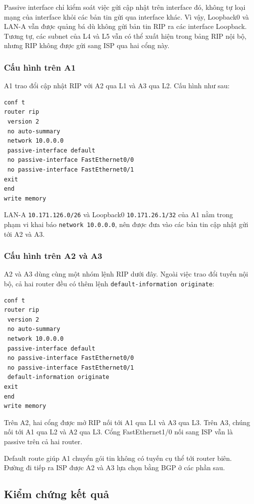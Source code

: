 Passive interface chỉ kiểm soát việc gửi
cập nhật trên interface đó, không tự loại
mạng của interface khỏi các bản tin gửi
qua interface khác. Vì vậy, Loopback0
và LAN-A vẫn được quảng bá dù không
gửi bản tin RIP ra các interface Loopback.
Tương tự, các subnet của L4 và L5
vẫn có thể xuất hiện trong bảng RIP nội bộ,
nhưng RIP không được gửi sang ISP qua hai cổng này.

\subsubsection{Cấu hình trên A1}

A1 trao đổi cập nhật RIP với A2 qua L1
và A3 qua L2. Cấu hình như sau:

\begin{lstlisting}
conf t
router rip
 version 2
 no auto-summary
 network 10.0.0.0
 passive-interface default
 no passive-interface FastEthernet0/0
 no passive-interface FastEthernet0/1
exit
end
write memory
\end{lstlisting}

LAN-A \texttt{10.171.126.0/26} và Loopback0
\texttt{10.171.26.1/32} của A1 nằm trong
phạm vi khai báo \texttt{network 10.0.0.0},
nên được đưa vào các bản tin cập nhật
gửi tới A2 và A3.

\subsubsection{Cấu hình trên A2 và A3}

A2 và A3 dùng cùng một nhóm lệnh RIP dưới đây.
Ngoài việc trao đổi tuyến nội bộ,
cả hai router đều có thêm lệnh
\texttt{default-information originate}:

\begin{lstlisting}
conf t
router rip
 version 2
 no auto-summary
 network 10.0.0.0
 passive-interface default
 no passive-interface FastEthernet0/0
 no passive-interface FastEthernet0/1
 default-information originate
exit
end
write memory
\end{lstlisting}

Trên A2, hai cổng được mở RIP nối tới
A1 qua L1 và A3 qua L3.
Trên A3, chúng nối tới A1 qua L2
và A2 qua L3.
Cổng FastEthernet1/0 nối sang ISP
vẫn là passive trên cả hai router.

Default route giúp A1 chuyển gói tin
không có tuyến cụ thể tới router biên.
Đường đi tiếp ra ISP được A2 và A3
lựa chọn bằng BGP ở các phần sau.

\subsection{Kiểm chứng kết quả}

